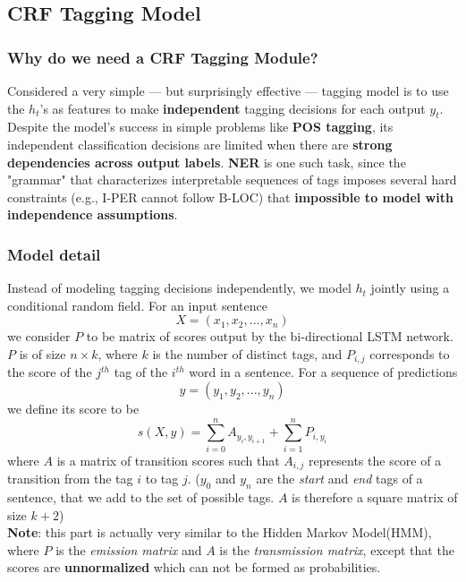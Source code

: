 \documentclass[a4paper, 12pt]{book} %
\begin{document}
\subsection{CRF Tagging Model}
\subsubsection{Why do we need a CRF Tagging Module?}
Considered a very simple --- but surprisingly effective --- tagging model is to use the $h_t$'s as features to make \textbf{independent} tagging decisions for each output $y_t$. Despite the model's success in simple problems like \textbf{POS tagging}, its independent classification decisions are limited when there are \textbf{strong dependencies across output labels}. \textbf{NER} is one such task, since the "grammar" that characterizes interpretable sequences of tags imposes several hard constraints (e.g., I-PER cannot follow B-LOC) that \textbf{impossible to model with independence assumptions}.

\subsubsection{Model detail}
Instead of modeling tagging decisions independently, we model $h_t$ jointly using a conditional random field. For an input sentence 
$$X=(x_1, x_2,...,x_n)$$
we consider $P$ to be matrix of scores output by the bi-directional LSTM network. $P$ is of size $n\times k$, where $k$ is the number of distinct tags, and $P_{i,j}$ corresponds to the score of the $j^{th}$ tag of the $i^{th}$ word in a sentence. For a sequence of predictions 
$$y=(y_1,y_2,...,y_n)$$
we define its score to be 
\begin{equation}
s(X,y)=\sum_{i=0}^{n}{A_{y_i,y_{i+1}}}+\sum_{i=1}^{n}{P_{i,y_i}}
\end{equation}
where $A$ is a matrix of transition scores such that $A_{i,j}$ represents the score of a transition from the tag $i$ to tag $j$. ($y_0$ and $y_n$ are the \emph{start} and \emph{end} tags of a sentence, that we add to the set of possible tags. $A$ is therefore a square matrix of size $k+2$) \\

\textbf{Note}: this part is actually very similar to the Hidden Markov Model(HMM), where $P$ is the \emph{emission matrix} and $A$ is the \emph{transmission matrix}, except that the scores are \textbf{unnormalized} which can not be formed as probabilities. \\
\end{document}
